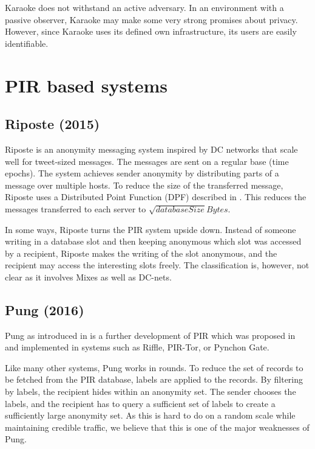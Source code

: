 Karaoke does not withstand an active adversary. In an environment with a passive observer, Karaoke may make some very strong promises about privacy. However, since Karaoke uses its defined own infrastructure, its users are easily identifiable.

\section{PIR based systems}

\subsection{Riposte (2015)}
Riposte\cite{corrigan2015riposte} is an anonymity messaging system inspired by DC networks that scale well for tweet-sized messages. The messages are sent on a regular base (time epochs). The system achieves sender anonymity by distributing parts of a message over multiple hosts. To reduce the size of the transferred message, Riposte uses a Distributed Point Function (DPF) described in \cite{gilboa2014distributed}. This reduces the messages transferred to each server to $\sqrt{databaseSize} Bytes$.

In some ways, Riposte turns the PIR system upside down. Instead of someone writing in a database slot and then keeping anonymous which slot was accessed by a recipient, Riposte makes the writing of the slot anonymous, and the recipient may access the interesting slots freely. The classification is, however, not clear as it involves Mixes as well as DC-nets.


\subsection{Pung (2016)}
Pung as introduced in\cite{angel2016unobservable} is a further development of PIR\cite{chor1995private} which was proposed in \citeyear{chor1995private} and implemented in systems such as Riffle\cite{kwon2016riffle}, PIR-Tor, or Pynchon Gate.

Like many other systems, Pung works in rounds. To reduce the set of records to be fetched from the PIR database, labels are applied to the records. By filtering by labels, the recipient hides within an anonymity set. The sender chooses the labels, and the recipient has to query a sufficient set of labels to create a sufficiently large anonymity set. As this is hard to do on a random scale while maintaining credible traffic, we believe that this is one of the major weaknesses of Pung.

